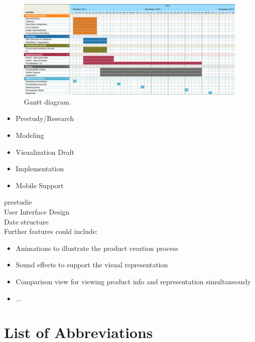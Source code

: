 \documentclass[a4page]{article}
\begin{document}
\begin{figure}[ht]
 \centering
 \includegraphics[scale=0.5]{gantt.png}
 \caption{Gantt diagram.}
 \label{fig:gant-diagram}
\end{figure}

\begin{itemize}
  \item Prestudy/Research
  \item Modeling
  \item Visualization Draft
  \item Implementation
  \item Mobile Support
  \
\end{itemize}
prestudie\\
User Interface Design\\
Date structure\\

Further features could include:
\begin{itemize}
\item Animations to illustrate the product creation process
\item Sound effects to support the visual representation
\item Comparison view for viewing product info and representation simultaneously
\item ...
\end{itemize}

\newpage
\section*{List of Abbreviations}
\begin{acronym}
\end{acronym}



\end{document}
